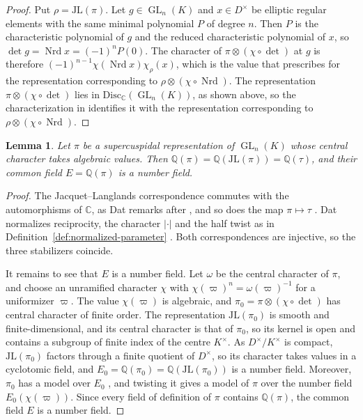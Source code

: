 \documentclass[a4paper,11pt]{amsart}
\newtheorem{lemma}[theorem]{Lemma}
\theoremstyle{definition}
\theoremstyle{remark}
\numberwithin{equation}{section}
\newcommand{\Q}{\mathbb{Q}}
\DeclareMathOperator{\GL}{GL}
\newcommand{\C}{\mathbb{C}}
\newcommand{\JL}{\mathrm{JL}}
\DeclareMathOperator{\Nrd}{Nrd}
\begin{document}
\begin{proof}
Put $\rho=\JL(\pi)$. Let $g\in\GL_n(K)$ and $x\in D^\times$ be elliptic regular elements with the same minimal polynomial $P$ of degree $n$. Then $P$ is the characteristic polynomial of $g$ and the reduced characteristic polynomial of $x$, so $\det g=\Nrd x=(-1)^nP(0)$. The character of $\pi\otimes(\chi\circ\det)$ at $g$ is therefore $(-1)^{n-1}\chi(\Nrd x)\chi_\rho(x)$, which is the value that \cite[Th\'eor\`eme~2.1.2]{Dat07} prescribes for the representation corresponding to $\rho\otimes(\chi\circ\Nrd)$. The representation $\pi\otimes(\chi\circ\det)$ lies in $\mathrm{Disc}_\C(\GL_n(K))$, as shown above, so the characterization in \cite[Th\'eor\`eme~2.1.2]{Dat07} identifies it with the representation corresponding to $\rho\otimes(\chi\circ\Nrd)$.
\end{proof}

\begin{lemma}\label{lem:common-rationality-field}
Let $\pi$ be a supercuspidal representation of $\GL_n(K)$ whose central character takes algebraic values. Then $\Q(\pi)=\Q(\JL(\pi))=\Q(\tau)$, and their common field $E=\Q(\pi)$ is a number field.
\end{lemma}

\begin{proof}
The Jacquet--Langlands correspondence commutes with the automorphisms of $\C$, as Dat remarks after \cite[Th\'eor\`eme~2.1.2]{Dat07}, and so does the map $\pi\mapsto\tau$ \cite[Fait~2.2.3]{Dat07}. Dat normalizes reciprocity, the character $|\cdot|$ and the half twist as in Definition~\ref{def:normalized-parameter} \cite[\S2.2.1]{Dat07}. Both correspondences are injective, so the three stabilizers coincide.

It remains to see that $E$ is a number field. Let $\omega$ be the central character of $\pi$, and choose an unramified character $\chi$ with $\chi(\varpi)^n=\omega(\varpi)^{-1}$ for a uniformizer $\varpi$. The value $\chi(\varpi)$ is algebraic, and $\pi_0=\pi\otimes(\chi\circ\det)$ has central character of finite order. The representation $\JL(\pi_0)$ is smooth and finite-dimensional, and its central character is that of $\pi_0$, so its kernel is open and contains a subgroup of finite index of the centre $K^\times$. As $D^\times/K^\times$ is compact, $\JL(\pi_0)$ factors through a finite quotient of $D^\times$, so its character takes values in a cyclotomic field, and $E_0=\Q(\pi_0)=\Q(\JL(\pi_0))$ is a number field. Moreover, $\pi_0$ has a model over $E_0$ \cite[Lemma~4.0.4]{Su23}, and twisting it gives a model of $\pi$ over the number field $E_0(\chi(\varpi))$. Since every field of definition of $\pi$ contains $\Q(\pi)$, the common field $E$ is a number field.
\end{proof}
\end{document}
